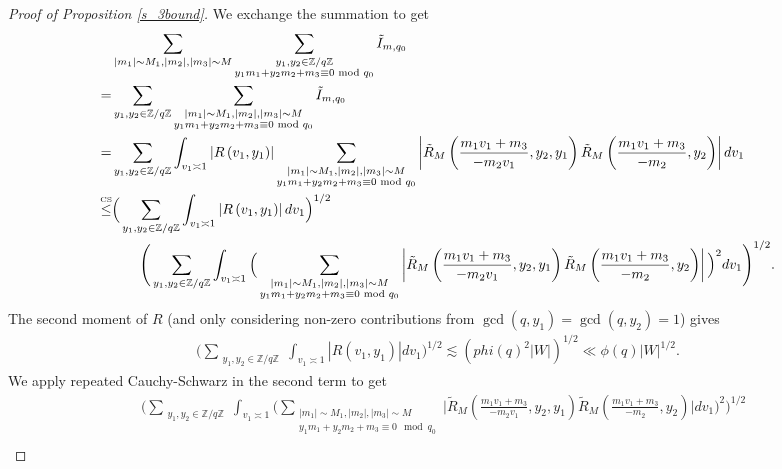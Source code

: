 \begin{proof}[{Proof of Proposition \ref{s_3bound}}]
    We exchange the summation to get \begin{align*}
    &\sum_{\substack{|m_1|\sim M_1,|m_2|,|m_3|\sim M}}\sum_{\substack{y_1,y_2 \in\mathbb{Z}/q\mathbb{Z} \\ y_1m_1+y_2m_2+m_3\equiv 0 \mod q_0}}\tilde{I}_{m,q_0}\\
    =&\sum_{\substack{y_1,y_2 \in\mathbb{Z}/q\mathbb{Z} }}\sum_{\substack{|m_1|\sim M_1,|m_2|,|m_3|\sim M\\ y_1m_1+y_2m_2+m_3\equiv 0 \mod q_0}}\tilde{I}_{m,q_0}\\
    =&\sum_{\substack{y_1,y_2 \in\mathbb{Z}/q\mathbb{Z} }}\int_{v_1\asymp 1} \left|R\left(v_1,y_1\right)\right|
    \sum_{\substack{|m_1|\sim M_1,|m_2|,|m_3|\sim M\\ y_1m_1+y_2m_2+m_3\equiv 0 \mod q_0}}\left| \tilde{R}_M\left(\frac{m_1v_1+m_3}{-m_2v_1},y_2,y_1\right)
    \tilde{R}_M\left(\frac{m_1v_1+m_3}{-m_2},y_2\right)\right| dv_1\\
    \stackon{CS}{\leq} & \Big(\sum_{\substack{y_1,y_2 \in\mathbb{Z}/q\mathbb{Z} }}\int_{v_1\asymp 1} \left|R\left(v_1,y_1\right)\right|dv_1\Big)^{1/2} 
    \\ & \quad \quad\Bigg(\sum_{\substack{y_1,y_2 \in\mathbb{Z}/q\mathbb{Z} }}\int_{v_1\asymp 1} \Big(\sum_{\substack{|m_1|\sim M_1,|m_2|,|m_3|\sim M\\ y_1m_1+y_2m_2+m_3\equiv 0 \mod q_0}}\left|\tilde{R}_M\left(\frac{m_1v_1+m_3}{-m_2v_1},y_2,y_1\right)
    \tilde{R}_M\left(\frac{m_1v_1+m_3}{-m_2},y_2\right)\right|\Big)^2 dv_1\Bigg)^{1/2}.
    \end{align*}
    The second moment of $R$ (and only considering non-zero contributions from $\gcd(q,y_1)=\gcd(q,y_2)=1$) gives \begin{align*}
        \Big(\sum_{\substack{y_1,y_2 \in\mathbb{Z}/q\mathbb{Z} }}\int_{v_1\asymp 1} \left|R\left(v_1,y_1\right)\right|dv_1\Big)^{1/2}  \lesssim (phi(q)^2 | W|)^{1/2} \ll \phi(q) | W|^{1/2}. 
    \end{align*}
    We apply repeated Cauchy-Schwarz in the second term to get \begin{align*}
     &   \Bigg(\sum_{\substack{y_1,y_2 \in\mathbb{Z}/q\mathbb{Z} }}\int_{v_1\asymp 1} \Big(\sum_{\substack{|m_1|\sim M_1,|m_2|,|m_3|\sim M\\ y_1m_1+y_2m_2+m_3\equiv 0 \mod q_0}}\Big|\tilde{R}_M\left(\frac{m_1v_1+m_3}{-m_2v_1},y_2,y_1\right)
    \tilde{R}_M\left(\frac{m_1v_1+m_3}{-m_2},y_2\right)\Big| dv_1\Big)^{2}\Bigg)^{1/2}\\

\end{align*}
\end{proof}
